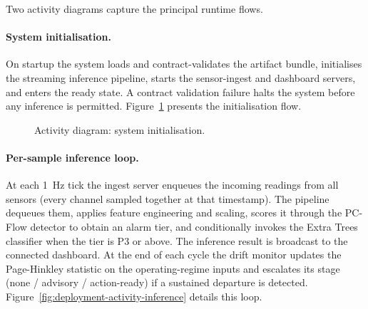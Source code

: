 Two activity diagrams capture the principal runtime flows.

\paragraph{System initialisation.} On startup the system loads and contract-validates the artifact bundle, initialises the streaming inference pipeline, starts the sensor-ingest and dashboard servers, and enters the ready state. A contract validation failure halts the system before any inference is permitted. Figure~\ref{fig:deployment-activity-init} presents the initialisation flow.

\begin{figure}[H]
\centering
{}
\caption{Activity diagram: system initialisation.}
\label{fig:deployment-activity-init}
\end{figure}

\paragraph{Per-sample inference loop.} At each 1~Hz tick the ingest server enqueues the incoming readings from all sensors (every channel sampled together at that timestamp). The pipeline dequeues them, applies feature engineering and scaling, scores it through the PC-Flow detector to obtain an alarm tier, and conditionally invokes the Extra Trees classifier when the tier is P3 or above. The inference result is broadcast to the connected dashboard. At the end of each cycle the drift monitor updates the Page-Hinkley statistic on the operating-regime inputs and escalates its stage (none / advisory / action-ready) if a sustained departure is detected. Figure~\ref{fig:deployment-activity-inference} details this loop.

